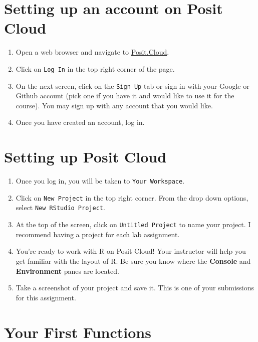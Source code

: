 \documentclass[
]{article}
\begin{document}
\section{Setting up an account on Posit
Cloud}\label{setting-up-an-account-on-posit-cloud}

\begin{enumerate}
\def\labelenumi{\arabic{enumi})}
\item
  Open a web browser and navigate to
  \href{https://posit.cloud/}{Posit.Cloud}.
\item
  Click on \texttt{Log\ In} in the top right corner of the page.
\item
  On the next screen, click on the \texttt{Sign\ Up} tab or sign in with
  your Google or Github account (pick one if you have it and would like
  to use it for the course). You may sign up with any account that you
  would like.
\item
  Once you have created an account, log in.
\end{enumerate}

\section{Setting up Posit Cloud}\label{setting-up-posit-cloud}

\begin{enumerate}
\def\labelenumi{\arabic{enumi})}
\item
  Once you log in, you will be taken to \texttt{Your\ Workspace}.
\item
  Click on \texttt{New\ Project} in the top right corner. From the drop
  down options, select \texttt{New\ RStudio\ Project}.
\item
  At the top of the screen, click on \texttt{Untitled\ Project} to name
  your project. I recommend having a project for each lab assignment.
\item
  You're ready to work with R on Posit Cloud! Your instructor will help
  you get familiar with the layout of R. Be sure you know where the
  \textbf{Console} and \textbf{Environment} panes are located.
\item
  Take a screenshot of your project and save it. This is one of your
  submissions for this assignment.
\end{enumerate}

\section{Your First Functions}\label{your-first-functions}
\end{document}

